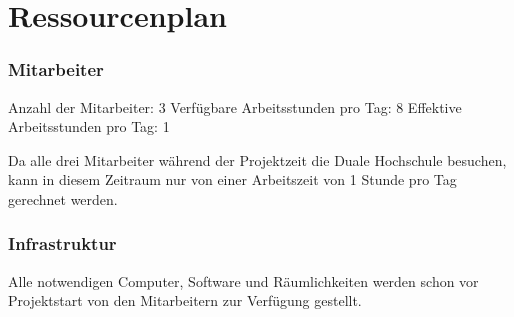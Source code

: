 \section{Ressourcenplan}
\subsubsection{Mitarbeiter}
Anzahl der Mitarbeiter: 3
Verfügbare Arbeitsstunden pro Tag: 8
Effektive Arbeitsstunden pro Tag: 1

Da alle drei Mitarbeiter während der Projektzeit die Duale Hochschule besuchen, kann in diesem Zeitraum nur von einer Arbeitszeit von 1 Stunde pro Tag gerechnet werden.

\subsubsection{Infrastruktur}
Alle notwendigen Computer, Software und Räumlichkeiten werden schon vor Projektstart von den Mitarbeitern zur Verfügung gestellt.